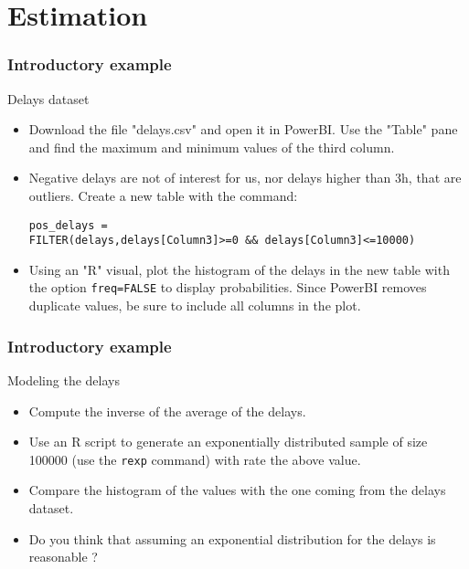 \documentclass[main.tex]{subfiles}
\begin{document}
\section{Estimation}
\begin{frame}[fragile]
    \frametitle{Introductory example}
\begin{block}{Delays dataset}
   \begin{itemize}
    \item<+-> Download the file "delays.csv" and open it in PowerBI. Use the "Table" pane and find the maximum and minimum values of the
    third column. 
    \item<+-> Negative delays are not of interest for us, nor delays higher than 3h, that are outliers. Create a new table with the command:
    {\footnotesize 
    \begin{verbatim}
pos_delays = 
FILTER(delays,delays[Column3]>=0 && delays[Column3]<=10000)
    \end{verbatim}}
    \item<+-> Using an "R" visual, plot the histogram of the delays in the new table with the option \texttt{freq=FALSE} to display probabilities.
    Since PowerBI removes duplicate values, be sure to include all columns in the plot.
\end{itemize}
\end{block}
\end{frame}
\begin{frame}
    \frametitle{Introductory example}
\begin{block}{Modeling the delays}
   \begin{itemize}
    \item<+-> Compute the inverse of the average of the delays.
    \item<+-> Use an R script to generate an exponentially distributed sample of size 100000 (use the \texttt{rexp} command) with rate the above value.
    \item<+-> Compare the histogram of the values with the one coming from the delays dataset. 
    \item<+-> Do you think that assuming an exponential distribution for the delays is reasonable ?
   \end{itemize} 
\end{block}
\end{frame}
\end{document}
